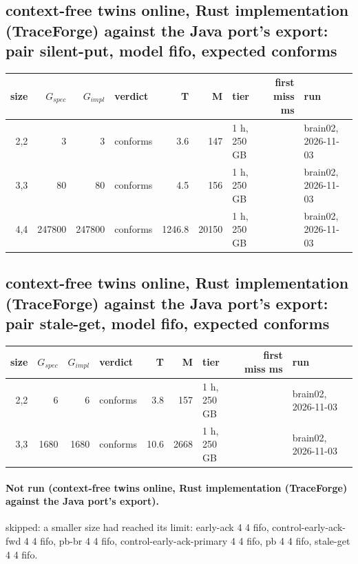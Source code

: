 \documentclass[10pt]{article}
\begin{document}
\subsection*{context-free twins online, Rust implementation (TraceForge) against the Java port's export: pair \textsf{silent-put}, model fifo, expected conforms}
\begin{longtable}{@{}rrrlrrlrl@{}}
\toprule
size & $G_{\mathit{spec}}$ & $G_{\mathit{impl}}$ & verdict & T & M & tier & first miss ms & run \\
\midrule
\endhead
\color{red} 2,2 & 3 & 3 & conforms & 3.6 & 147 & 1 h, 250 GB &  & brain02, 2026-11-03 \\
\color{red} 3,3 & 80 & 80 & conforms & 4.5 & 156 & 1 h, 250 GB &  & brain02, 2026-11-03 \\
\color{red} 4,4 & 247800 & 247800 & conforms & 1246.8 & 20150 & 1 h, 250 GB &  & brain02, 2026-11-03 \\
\bottomrule
\end{longtable}
\subsection*{context-free twins online, Rust implementation (TraceForge) against the Java port's export: pair \textsf{stale-get}, model fifo, expected conforms}
\begin{longtable}{@{}rrrlrrlrl@{}}
\toprule
size & $G_{\mathit{spec}}$ & $G_{\mathit{impl}}$ & verdict & T & M & tier & first miss ms & run \\
\midrule
\endhead
\color{red} 2,2 & 6 & 6 & conforms & 3.8 & 157 & 1 h, 250 GB &  & brain02, 2026-11-03 \\
\color{red} 3,3 & 1680 & 1680 & conforms & 10.6 & 2668 & 1 h, 250 GB &  & brain02, 2026-11-03 \\
\bottomrule
\end{longtable}
\paragraph{Not run (context-free twins online, Rust implementation (TraceForge) against the Java port's export).}
skipped: a smaller size had reached its limit: early-ack 4 4 fifo, control-early-ack-fwd 4 4 fifo, pb-br 4 4 fifo, control-early-ack-primary 4 4 fifo, pb 4 4 fifo, stale-get 4 4 fifo.\par
\end{document}
